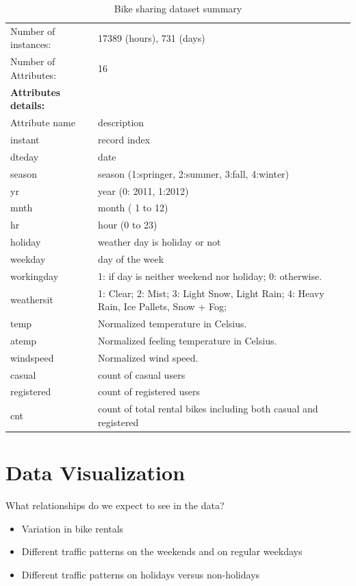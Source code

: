 \documentclass[12pt]{article}
\begin{document}
\begin{table}[H]
	\label{table:dataset}
	\begin{tabular}{| l | p{11cm} |} \hline
		Number of instances: & 17389 (hours), 731 (days)\\
		Number of Attributes: & 16\\ \hline \hline
		\textbf{Attributes details:} &\\ \hline
		Attribute name  & description\\ \hline
		instant   & record index\\ \hline
		dteday    & date\\ \hline
		season  & season (1:springer, 2:summer, 3:fall, 4:winter)\\ \hline
		yr    &  year (0: 2011, 1:2012)\\ \hline
		mnth &   month ( 1 to 12)\\ \hline
		hr & hour (0 to 23) \\ \hline
		holiday   & weather day is holiday or not \\ \hline
		weekday   &  day of the week \\ \hline
		workingday   & 1: if day is neither weekend nor holiday; 0: otherwise.\\ \hline
		weathersit   & 1: Clear; 2: Mist; 3: Light Snow, Light Rain; 4: Heavy Rain, Ice Pallets, Snow + Fog;\\ \hline
		temp   & Normalized temperature in Celsius. \\ \hline
		atemp    & Normalized feeling temperature in Celsius. \\ \hline
		windspeed   & Normalized wind speed. \\ \hline
		casual   & count of casual users\\ \hline
		registered   & count of registered users\\ \hline
		cnt   & count of total rental bikes including both casual and registered \\ \hline
	\end{tabular}
	\caption{Bike sharing dataset summary}
\end{table}
 
 
\section{Data Visualization}
\label{sec:visual}
 
What relationships do we expect to see in the data?
\begin{itemize}
	\item Variation in bike rentals
	\item Different traffic patterns on the weekends and on regular weekdays
	\item Different traffic patterns on holidays versus non-holidays
\end{itemize}
 
\end{document}

